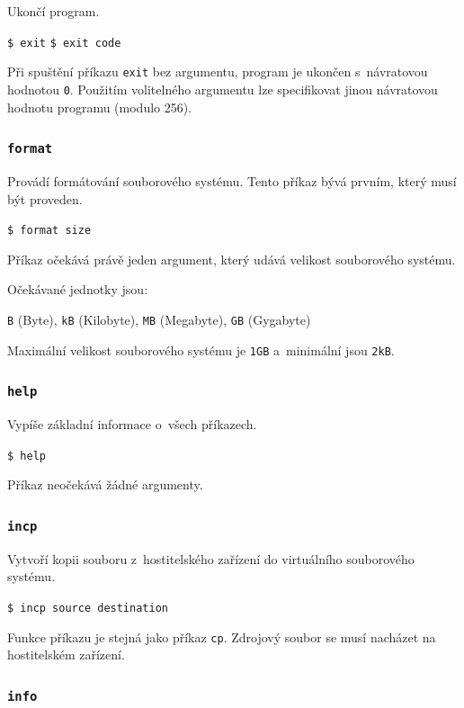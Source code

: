 \documentclass[12pt]{article}
\begin{document}
Ukončí program.

\texttt{\$ exit}\qquad
\texttt{\$ exit code}

Při spuštění příkazu \texttt{exit} bez argumentu, program je ukončen s~návratovou hodnotou \texttt{0}.
Použitím volitelného argumentu lze specifikovat jinou návratovou hodnotu programu (modulo 256).

\subsubsection{\texttt{format}}\label{sec:format}

Provádí formátování souborového systému.
Tento příkaz bývá prvním, který musí být proveden.

\texttt{\$ format size}

Příkaz očekává právě jeden argument, který udává velikost souborového systému.

Očekávané jednotky jsou:

\texttt{B} (Byte),
\texttt{kB} (Kilobyte),
\texttt{MB} (Megabyte),
\texttt{GB} (Gygabyte)

Maximální velikost souborového systému je \texttt{1GB} a~minimální jsou \texttt{2kB}.

\subsubsection{\texttt{help}}\label{sec:help}

Vypíše základní informace o~všech příkazech.

\texttt{\$ help}

Příkaz neočekává žádné argumenty.

\newpage

\subsubsection{\texttt{incp}}\label{sec:incp}

Vytvoří kopii souboru z~hostitelského zařízení do virtuálního souborového systému.

\texttt{\$ incp source destination}

Funkce příkazu je stejná jako příkaz \texttt{cp}.
Zdrojový soubor se musí nacházet na hostitelském zařízení.

\subsubsection{\texttt{info}}\label{sec:info}
\end{document}
